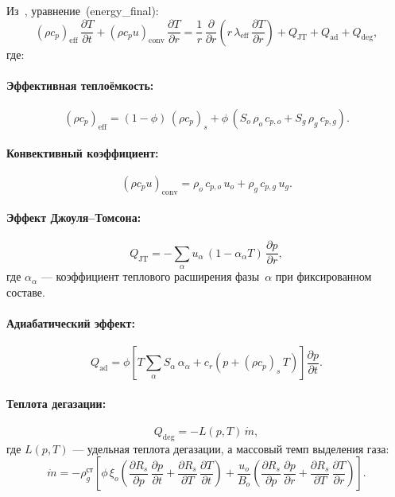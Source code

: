 \documentclass[12pt,a4paper]{article}
\newcommand{\pp}{\partial}
\newcommand{\eff}{\mathrm{eff}}
\newcommand{\st}{\text{ст}}
\begin{document}
Из~\cite{draft4}, уравнение~(energy\_final):
\begin{equation}\label{eq:energy}
  \boxed{
    (\rho c_p)_\eff\,\frac{\pp T}{\pp t}
    + (\rho c_p u)_\mathrm{conv}\,\frac{\pp T}{\pp r}
    = \frac{1}{r}\,\frac{\pp}{\pp r}\!\left(
        r\,\lambda_\eff\,\frac{\pp T}{\pp r}
      \right)
    + Q_\mathrm{JT} + Q_\mathrm{ad} + Q_\mathrm{deg},
  }
\end{equation}
где:

\paragraph{Эффективная теплоёмкость:}
\begin{equation}\label{eq:rhocp_eff}
  (\rho c_p)_\eff
  = (1-\phi)\,(\rho c_p)_s
    + \phi\,(S_o\,\rho_o\,c_{p,o} + S_g\,\rho_g\,c_{p,g}).
\end{equation}

\paragraph{Конвективный коэффициент:}
\begin{equation}\label{eq:rhocp_conv}
  (\rho c_p u)_\mathrm{conv}
  = \rho_o\,c_{p,o}\,u_o + \rho_g\,c_{p,g}\,u_g.
\end{equation}

\paragraph{Эффект Джоуля--Томсона:}
\begin{equation}\label{eq:QJT}
  Q_\mathrm{JT} = -\sum_\alpha u_\alpha\,(1 - \alpha_\alpha T)\,
    \frac{\pp p}{\pp r},
\end{equation}
где $\alpha_\alpha$ --- коэффициент теплового расширения
фазы~$\alpha$ при фиксированном составе.

\paragraph{Адиабатический эффект:}
\begin{equation}\label{eq:Qad}
  Q_\mathrm{ad} = \phi\!\left[
    T\sum_\alpha S_\alpha\,\alpha_\alpha
    + c_r\!\left(p + (\rho c_p)_s\,T\right)
  \right]\frac{\pp p}{\pp t}.
\end{equation}

\paragraph{Теплота дегазации:}
\begin{equation}\label{eq:Qdeg}
  Q_\mathrm{deg} = -L(p,T)\,\dot{m},
\end{equation}
где $L(p,T)$ --- удельная теплота дегазации, а массовый темп
выделения газа:
\begin{equation}\label{eq:mdot}
  \dot{m} = -\rho_g^\st\!\left[
    \phi\,\xi_o\!\left(
      \frac{\pp R_s}{\pp p}\,\frac{\pp p}{\pp t}
      + \frac{\pp R_s}{\pp T}\,\frac{\pp T}{\pp t}
    \right)
    + \frac{u_o}{B_o}\!\left(
      \frac{\pp R_s}{\pp p}\,\frac{\pp p}{\pp r}
      + \frac{\pp R_s}{\pp T}\,\frac{\pp T}{\pp r}
    \right)
  \right].
\end{equation}
\end{document}

